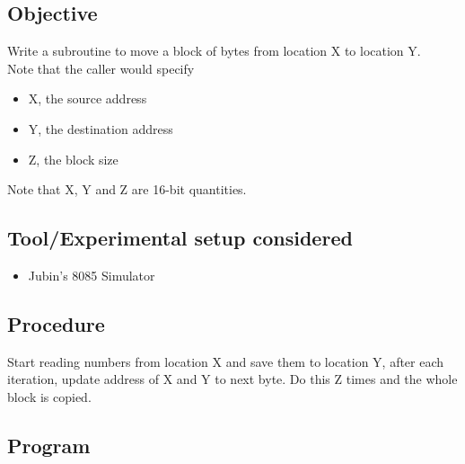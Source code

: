 \documentclass[a4paper]{article} %
\begin{document}
    \subsection{Objective}
    Write a subroutine to move a block of bytes from location X to location Y.\\
    Note that the caller would specify 
    \begin{itemize}
        \item X, the source address
        \item Y, the destination address
        \item Z, the block size
    \end{itemize}
    Note that X, Y and Z are 16-bit quantities.
    \subsection{Tool/Experimental setup considered}
        \begin{itemize}
            \item Jubin's 8085 Simulator
        \end{itemize}
    \subsection{Procedure}
        Start reading numbers from location X and save them to location Y, after each iteration, update address of X and Y to next byte. Do this Z times and the whole block is copied.
    \subsection{Program}
        
        \newpage
\end{document}
